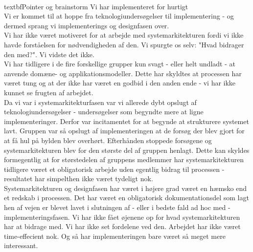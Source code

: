 \\textbf{Pointer og brainstorm}
Vi har implementeret for hurtigt\\
Vi er kommet til at hoppe fra teknologiundersøgelser til implementering - og dermed sprang vi implementerings og designfasen over.\\
Vi har ikke været motiveret for at arbejde med systemarkitekturen fordi vi ikke havde forståelsen for nødvendigheden af den. Vi spurgte os selv: "Hvad bidrager den med?". Vi vidste det ikke.\\
Vi har tidligere i de fire forskellige grupper kun svagt - eller helt undladt - at anvende domæne- og applikationsmodeller. Dette har skyldtes at processen har været tung og at der ikke har været en godbid i den anden ende - vi har ikke kunnet se frugten af arbejdet.\\
Da vi var i systemarkitekturfasen var vi allerede dybt opslugt af teknologiundersøgelser - undersøgelser som begyndte mere at ligne implementeringer. Derfor var incitamentet for at begynde at strukturere systemet lavt. Gruppen var så opslugt af implementeringen at de forsøg der blev gjort for at få hul på bylden blev overhørt. Efterhånden stoppede forsøgene og systemarkitekturen blev for den største del af gruppen henlagt. Dette kan skyldes formegentlig at for størstedelen af gruppens medlemmer har systemarkitekturen tidligere været et obligatorisk arbejde uden egentlig bidrag til processen - resultatet har simpelthen ikke været tydeligt nok.\\
Systemarkitekturen og designfasen har været i højere grad været en hæmsko end et redskab i processen. Det har været en obligatorisk dokumentationsdel som lagt hen af vejen er blevet lavet i slutningen af - eller i bedste fald ad hoc med - implementeringsfasen. Vi har ikke fået øjenene op for hvad systemarkitekturen har at bidrage med. Vi har ikke set fordelene ved den. Arbejdet har ikke været time-effecient nok. Og så har implementeringen bare været så meget mere interessant.\\

